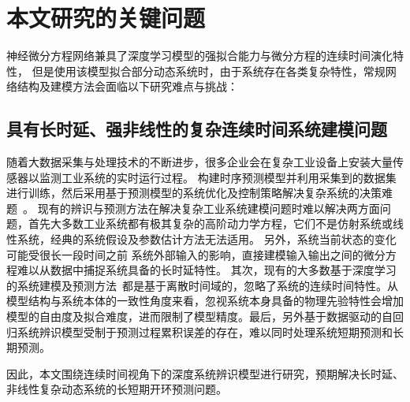 \section{本文研究的关键问题}
\label{sec:challenge}

神经微分方程网络兼具了深度学习模型的强拟合能力与微分方程的连续时间演化特性，
但是使用该模型拟合部分动态系统时，由于系统存在各类复杂特性，常规网络结构及建模方法会面临以下研究难点与挑战：
\subsection{具有长时延、强非线性的复杂连续时间系统建模问题}
随着大数据采集与处理技术的不断进步，很多企业会在复杂工业设备上安装大量传感器以监测工业系统的实时运行过程。
构建时序预测模型并利用采集到的数据集进行训练，然后采用基于预测模型的系统优化及控制策略解决复杂系统的决策难题~\cite{Yuan2020,Member2019,wu2020optimization}。
现有的辨识与预测方法在解决复杂工业系统建模问题时难以解决两方面问题，首先大多数工业系统都有极其复杂的高阶动力学方程，它们不是仿射系统或线性系统，经典的系统假设及参数估计方法无法适用。
另外，系统当前状态的变化可能受很长一段时间之前
系统外部输入的影响，直接建模输入输出之间的微分方程难以从数据中捕捉系统具备的长时延特性。
其次，现有的大多数基于深度学习的系统建模及预测方法~\cite{Member2019,Essien2020,9161367,9522017,neu2021systematic}都是基于离散时间域的，忽略了系统的连续时间特性。从模型结构与系统本体的一致性角度来看，忽视系统本身具备的物理先验特性会增加模型的自由度及拟合难度，进而限制了模型精度。最后，另外基于数据驱动的自回归系统辨识模型受制于预测过程累积误差的存在，难以同时处理系统短期预测和长期预测。

因此，本文围绕连续时间视角下的深度系统辨识模型进行研究，预期解决长时延、非线性复杂动态系统的长短期开环预测问题。

